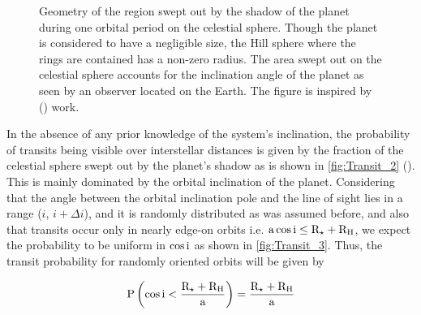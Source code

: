\begin{figure}[!ht]
\centering
\caption{\scriptsize{Geometry of the region swept out by the shadow of the planet during one orbital period on the celestial sphere. Though the planet is considered to have a negligible size, the Hill sphere where the rings are contained has a non-zero radius. The area swept out on the celestial sphere accounts for the inclination angle of the planet as seen by an observer located on the Earth. The figure is inspired by  (\citeyear{Cameron2016}) work.}}
\label{fig:Transit_2}
\end{figure}

In the absence of any prior knowledge of the system's inclination, the probability of transits being visible over interstellar distances is given by the fraction of the celestial sphere swept out by the planet's shadow as is shown in \autoref{fig:Transit_2}  (\citeyear{Cameron2016}). This is mainly dominated by the orbital inclination of the planet. Considering that the angle between the orbital inclination pole and the line of sight lies in a range ($i$, $i + \Delta i$), and it is randomly distributed as was assumed before, and also that transits occur only in nearly edge-on orbits i.e. $\textnormal{a} \cos \textnormal{i} \leq \textnormal{R}_\star + \textnormal{R}_\textnormal{H}$, we expect the probability to be uniform in $\mathrm{\cos \textnormal{i}}$ as shown in \autoref{fig:Transit_3}. Thus, the transit probability for randomly oriented orbits will be given by

\begingroup
\Large
\begin{equation}
\textnormal{P} \left( \cos \textnormal{i} < \frac{\textnormal{R}_\star + \textnormal{R}_\textnormal{H}}{\textnormal{a}} \right) = \frac{\textnormal{R}_\star + \textnormal{R}_\textnormal{H}}{\textnormal{a}}
 \label{eq:ProbTransit_4}
\end{equation}
\endgroup

